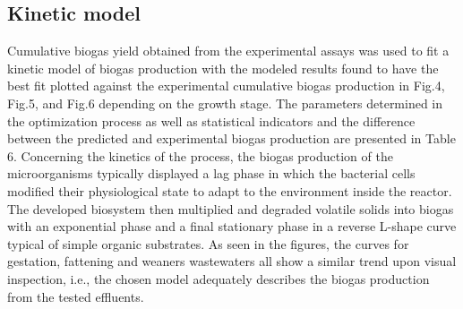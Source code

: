 \subsection{Kinetic model}
Cumulative biogas yield obtained from the experimental assays was used to fit a kinetic model of biogas production with the modeled results found to have the best fit plotted against the experimental cumulative biogas production in Fig.4, Fig.5, and Fig.6 depending on the growth stage. The parameters determined in the optimization process as well as statistical indicators and the difference between the predicted and experimental biogas production are presented in Table 6.
Concerning the kinetics of the process, the biogas production of the microorganisms typically displayed a lag phase in which the bacterial cells modified their physiological state to adapt to the environment inside the reactor. The developed biosystem then multiplied and degraded volatile solids into biogas with an exponential phase and a final stationary phase in a reverse L-shape curve typical of simple organic substrates. As seen in the figures, the curves for gestation, fattening and weaners wastewaters all show a similar trend upon visual inspection, i.e., the chosen model adequately describes the biogas production from the tested effluents. 

